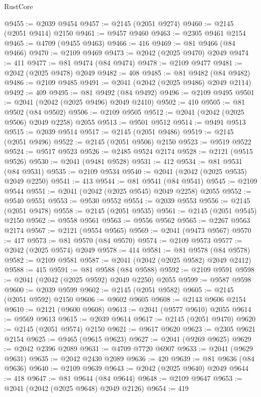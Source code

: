 \begin{lexlean}{RustCore}
\begin{coremodule}
@9455 := @2039 @9454
@9457 := @2145 (@2051 @9274)
@9460 := @2145 (@2051 @9414) @2150
@9461 := @9457 @9460
@9463 := @2305 @9461 @2154
@9465 := @4709 (@9455 @9463)
@9466 := 416
@9469 := @81 @9466 (@84 @9466)
@9470 := @2109 @9469
@9473 := @2042 (@2025 @9470) @2049
@9474 := 411
@9477 := @81 @9474 (@84 @9474)
@9478 := @2109 @9477
@9481 := @2042 (@2025 @9478) @2049
@9482 := 408
@9485 := @81 @9482 (@84 @9482)
@9486 := @2109 @9485
@9491 := @2041 (@2042 (@2025 @9486) @2049 @2114)
@9492 := 409
@9495 := @81 @9492 (@84 @9492)
@9496 := @2109 @9495
@9501 := @2041 (@2042 (@2025 @9496) @2049 @2410)
@9502 := 410
@9505 := @81 @9502 (@84 @9502)
@9506 := @2109 @9505
@9512 := @2041 (@2042 (@2025 @9506) @2049 @2258) @2055
@9513 := @9501 @9512
@9514 := @9491 @9513
@9515 := @2039 @9514
@9517 := @2145 (@2051 @9486)
@9519 := @2145 (@2051 @9496)
@9522 := @2145 (@2051 @9506) @2150
@9523 := @9519 @9522
@9524 := @9517 @9523
@9526 := @2485 @9524 @2174
@9528 := @2121 (@9515 @9526)
@9530 := @2041 (@9481 @9528)
@9531 := 412
@9534 := @81 @9531 (@84 @9531)
@9535 := @2109 @9534
@9540 := @2041 (@2042 (@2025 @9535) @2049 @2250)
@9541 := 413
@9544 := @81 @9541 (@84 @9541)
@9545 := @2109 @9544
@9551 := @2041 (@2042 (@2025 @9545) @2049 @2258) @2055
@9552 := @9540 @9551
@9553 := @9530 @9552
@9554 := @2039 @9553
@9556 := @2145 (@2051 @9478)
@9558 := @2145 (@2051 @9535)
@9561 := @2145 (@2051 @9545) @2150
@9562 := @9558 @9561
@9563 := @9556 @9562
@9565 := @2267 @9563 @2174
@9567 := @2121 (@9554 @9565)
@9569 := @2041 (@9473 @9567)
@9570 := 417
@9573 := @81 @9570 (@84 @9570)
@9574 := @2109 @9573
@9577 := @2042 (@2025 @9574) @2049
@9578 := 414
@9581 := @81 @9578 (@84 @9578)
@9582 := @2109 @9581
@9587 := @2041 (@2042 (@2025 @9582) @2049 @2412)
@9588 := 415
@9591 := @81 @9588 (@84 @9588)
@9592 := @2109 @9591
@9598 := @2041 (@2042 (@2025 @9592) @2049 @2250) @2055
@9599 := @9587 @9598
@9600 := @2039 @9599
@9602 := @2145 (@2051 @9582)
@9605 := @2145 (@2051 @9592) @2150
@9606 := @9602 @9605
@9608 := @2143 @9606 @2154
@9610 := @2121 (@9600 @9608)
@9613 := @2041 (@9577 @9610) @2055
@9614 := @9569 @9613
@9615 := @2039 @9614
@9617 := @2145 (@2051 @9470)
@9620 := @2145 (@2051 @9574) @2150
@9621 := @9617 @9620
@9623 := @2305 @9621 @2154
@9625 := @9465 (@9615 @9623)
@9627 := @2041 (@9269 @9625)
@9629 := @2042 @2396 @2089
@9631 := @4709 @7720 @6907
@9633 := @2041 (@9629 @9631)
@9635 := @2042 @2430 @2089
@9636 := 420
@9639 := @81 @9636 (@84 @9636)
@9640 := @2109 @9639
@9643 := @2042 (@2025 @9640) @2049
@9644 := 418
@9647 := @81 @9644 (@84 @9644)
@9648 := @2109 @9647
@9653 := @2041 (@2042 (@2025 @9648) @2049 @2126)
@9654 := 419

\end{coremodule}
\end{lexlean}
